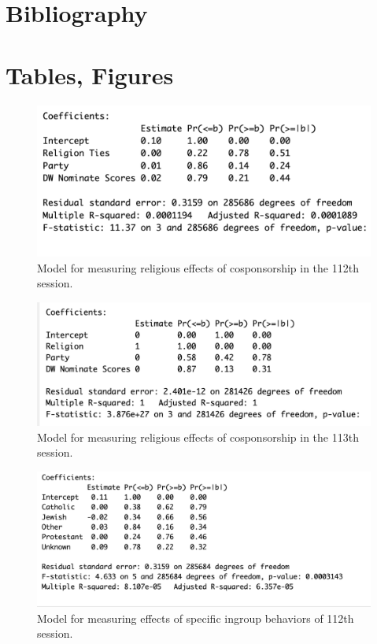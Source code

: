 \documentclass[Royal,times,sageh]{sagej}
\begin{document}
\hypertarget{bibliography}{%
\section{Bibliography}\label{bibliography}}

\hypertarget{tables-figures}{%
\section{Tables, Figures}\label{tables-figures}}

\begin{figure}

{\centering \includegraphics[width=0.7\linewidth]{images/112th_religion_firstmodel} 

}

\caption{Model for measuring religious effects of cosponsorship in the 112th session.\label{table1}}\label{fig:table1}
\end{figure}

\begin{figure}

{\centering \includegraphics[width=0.7\linewidth]{images/117th_religion_firstmodel} 

}

\caption{Model for measuring religious effects of cosponsorship in the 113th session. \label{table2}}\label{fig:table2}
\end{figure}

\begin{figure}

{\centering \includegraphics[width=0.7\linewidth]{images/112th_religion} 

}

\caption{Model for measuring effects of specific ingroup behaviors of 112th session. \label{table3}}\label{fig:table3}
\end{figure}
\end{document}
